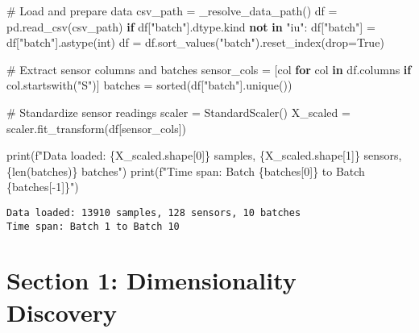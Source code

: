 \documentclass[
  letterpaper,
  DIV=11,
  numbers=noendperiod]{scrartcl}
\newenvironment{Shaded}{\begin{snugshade}}{\end{snugshade}}
\newcommand{\BuiltInTok}[1]{\textcolor[rgb]{0.00,0.23,0.31}{#1}}
\newcommand{\CommentTok}[1]{\textcolor[rgb]{0.37,0.37,0.37}{#1}}
\newcommand{\ControlFlowTok}[1]{\textcolor[rgb]{0.00,0.23,0.31}{\textbf{#1}}}
\newcommand{\DecValTok}[1]{\textcolor[rgb]{0.68,0.00,0.00}{#1}}
\newcommand{\KeywordTok}[1]{\textcolor[rgb]{0.00,0.23,0.31}{\textbf{#1}}}
\newcommand{\NormalTok}[1]{\textcolor[rgb]{0.00,0.23,0.31}{#1}}
\newcommand{\OperatorTok}[1]{\textcolor[rgb]{0.37,0.37,0.37}{#1}}
\newcommand{\SpecialCharTok}[1]{\textcolor[rgb]{0.37,0.37,0.37}{#1}}
\newcommand{\SpecialStringTok}[1]{\textcolor[rgb]{0.13,0.47,0.30}{#1}}
\newcommand{\StringTok}[1]{\textcolor[rgb]{0.13,0.47,0.30}{#1}}
\newcommand{\VariableTok}[1]{\textcolor[rgb]{0.07,0.07,0.07}{#1}}
\renewenvironment{Shaded}{%
  \begin{tcolorbox}[%
    enhanced,%
    colback=codebg,%
    colframe=codebg,%
    borderline west={3pt}{0pt}{sectionblue},%
    fontupper=\small\ttfamily,%
    boxrule=0pt,%
    arc=0pt,%
    boxsep=5pt,%
    left=2mm,%
    right=2mm,%
    top=2mm,%
    bottom=2mm%
  ]%
}{%
  \end{tcolorbox}%
}
\begin{document}
\begin{Shaded}
\begin{Highlighting}[]
\CommentTok{\# Load and prepare data}
\NormalTok{csv\_path }\OperatorTok{=}\NormalTok{ \_resolve\_data\_path()}
\NormalTok{df }\OperatorTok{=}\NormalTok{ pd.read\_csv(csv\_path)}
\ControlFlowTok{if}\NormalTok{ df[}\StringTok{"batch"}\NormalTok{].dtype.kind }\KeywordTok{not} \KeywordTok{in} \StringTok{"iu"}\NormalTok{:}
\NormalTok{    df[}\StringTok{"batch"}\NormalTok{] }\OperatorTok{=}\NormalTok{ df[}\StringTok{"batch"}\NormalTok{].astype(}\BuiltInTok{int}\NormalTok{)}
\NormalTok{df }\OperatorTok{=}\NormalTok{ df.sort\_values(}\StringTok{"batch"}\NormalTok{).reset\_index(drop}\OperatorTok{=}\VariableTok{True}\NormalTok{)}

\CommentTok{\# Extract sensor columns and batches}
\NormalTok{sensor\_cols }\OperatorTok{=}\NormalTok{ [col }\ControlFlowTok{for}\NormalTok{ col }\KeywordTok{in}\NormalTok{ df.columns }\ControlFlowTok{if}\NormalTok{ col.startswith(}\StringTok{"S"}\NormalTok{)]}
\NormalTok{batches }\OperatorTok{=} \BuiltInTok{sorted}\NormalTok{(df[}\StringTok{"batch"}\NormalTok{].unique())}

\CommentTok{\# Standardize sensor readings}
\NormalTok{scaler }\OperatorTok{=}\NormalTok{ StandardScaler()}
\NormalTok{X\_scaled }\OperatorTok{=}\NormalTok{ scaler.fit\_transform(df[sensor\_cols])}

\BuiltInTok{print}\NormalTok{(}\SpecialStringTok{f"Data loaded: }\SpecialCharTok{\{}\NormalTok{X\_scaled}\SpecialCharTok{.}\NormalTok{shape[}\DecValTok{0}\NormalTok{]}\SpecialCharTok{\}}\SpecialStringTok{ samples, }\SpecialCharTok{\{}\NormalTok{X\_scaled}\SpecialCharTok{.}\NormalTok{shape[}\DecValTok{1}\NormalTok{]}\SpecialCharTok{\}}\SpecialStringTok{ sensors, }\SpecialCharTok{\{}\BuiltInTok{len}\NormalTok{(batches)}\SpecialCharTok{\}}\SpecialStringTok{ batches"}\NormalTok{)}
\BuiltInTok{print}\NormalTok{(}\SpecialStringTok{f"Time span: Batch }\SpecialCharTok{\{}\NormalTok{batches[}\DecValTok{0}\NormalTok{]}\SpecialCharTok{\}}\SpecialStringTok{ to Batch }\SpecialCharTok{\{}\NormalTok{batches[}\OperatorTok{{-}}\DecValTok{1}\NormalTok{]}\SpecialCharTok{\}}\SpecialStringTok{"}\NormalTok{)}
\end{Highlighting}
\end{Shaded}

\begin{verbatim}
Data loaded: 13910 samples, 128 sensors, 10 batches
Time span: Batch 1 to Batch 10
\end{verbatim}

\section{Section 1: Dimensionality
Discovery}\label{section-1-dimensionality-discovery}
\end{document}
